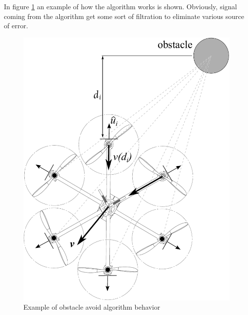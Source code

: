 In figure \ref{fig:obstavoidexample} an example of how the algorithm works is shown. Obviously, signal coming from the algorithm get some sort of filtration to eliminate various source of error.
\begin{figure}[h]
	\centering
	\includegraphics[scale=0.45]{ch3/img/obstavoid_dist.pdf}
	\caption{Example of obstacle avoid algorithm behavior}
	\label{fig:obstavoidexample}
	\forceversofloat
\end{figure}

